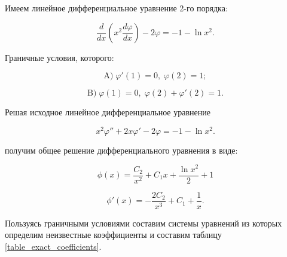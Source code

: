 \documentclass{article}
\begin{document}
Имеем линейное дифференциальное уравнение 2-го порядка:

\begin{displaymath}
	\frac{d}{dx}(x^2 \frac{d \varphi}{dx}) - 2\varphi = -1 - \ln{x^2}.
\end{displaymath}

\noindent Граничные условия, которого:

\begin{displaymath}
	\text{A)} \; \varphi'(1) = 0, \; \varphi(2) = 1;
\end{displaymath}

\begin{displaymath}
	\text{B)} \; \varphi(1) = 0, \; \varphi(2) + \varphi'(2) = 1.
\end{displaymath}

\noindent Решая исходное линейное дифференциальное уравнение

\begin{displaymath}
	x^2 \varphi'' + 2 x \varphi' - 2 \varphi = -1 - \ln{x^2}.
\end{displaymath}

\noindent получим общее решение дифференциального уравнения в виде:

\begin{displaymath}
	\phi(x) = \frac{C_{2}}{x^2} + C_{1}x + \frac{\ln{x^2}}{2} + 1
\end{displaymath}

\begin{displaymath}
	\phi'(x) = - \frac{2C_{2}}{x^3} + C_{1} + \frac{1}{x}.
\end{displaymath}

Пользуясь граничными условиями составим системы уравнений из которых определим неизвестные коэффициенты и составим таблицу \ref{table_exact_coefficients}. 
\end{document}
